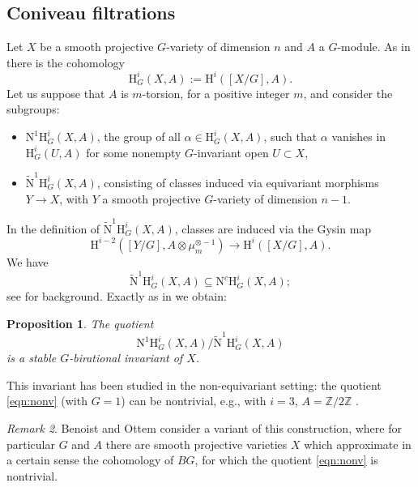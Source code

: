 \documentclass[12pt,reqno]{amsart}
\theoremstyle{plain}
\newtheorem{prop}{Proposition}[section]
\theoremstyle{remark}
\newtheorem{rema}[prop]{Remark}
\theoremstyle{definition}
\numberwithin{equation}{section}
\newcommand{\rH}{{\mathrm H}}
\newcommand{\rN}{{\mathrm N}}
\newcommand{\bZ}{{\mathbb Z}}
\begin{document}
\subsection{Coniveau filtrations}
\label{sect:coniveau}
Let $X$ be a smooth projective $G$-variety of dimension $n$ and $A$ a $G$-module.
As in \cite[Sect.\ 3]{KT-uni} there is the cohomology
$$
\rH^i_G(X,A):=\rH^i([X/G],A).
$$
Let us suppose that $A$ is $m$-torsion, for a positive integer $m$, and consider the subgroups:
\begin{itemize}
\item 
$\rN^1\rH^i_G(X,A)$, the group of all $\alpha \in \rH^i_G(X,A)$, such that $\alpha$ vanishes in $\rH^i_G(U,A)$ for some nonempty $G$-invariant open $U\subset X$, 
\item 
$\widetilde{\rN}^1\rH^i_G(X,A)$, consisting of classes induced via equivariant morphisms $Y\to X$, with $Y$ a smooth projective $G$-variety of dimension $n-1$.
\end{itemize}
In the definition of $\widetilde{\rN}^1\rH^i_G(X,A)$,
classes are induced via the Gysin map
$$
\rH^{i-2}([Y/G],A\otimes \mu_m^{\otimes -1})\to \rH^i([X/G],A).
$$
We have
\begin{equation} 
\label{eqn:nc}
\widetilde{\rN}^1\rH^i_G(X,A) \subseteq \rN^c\rH^i_G(X, A);
\end{equation}
see \cite{BO} for background.
Exactly as in \cite[Prop.\ 2.4]{BO} we obtain:

\begin{prop}
\label{prop:n1}
The quotient
\begin{equation}
    \label{eqn:nonv}
\rN^1\rH^i_G(X,A)/\widetilde{\rN}^1\rH^i_G(X,A) 
\end{equation}
is a stable $G$-birational invariant of $X$. 
\end{prop}

This invariant has been studied in the non-equivariant setting: the quotient \eqref{eqn:nonv} (with $G=1$) can be nontrivial, e.g., with $i=3$, $A=\bZ/2\bZ$ \cite{kameko}.

\begin{rema}
\label{rem.anotherapproach}
Benoist and Ottem \cite[Thm. 4.3]{BO} consider a variant of this construction, where for particular $G$ and $A$ there are smooth projective varieties $X$ which approximate in a certain sense the cohomology of $BG$,
for which the quotient \eqref{eqn:nonv} is nontrivial.
\end{rema}
\end{document}
